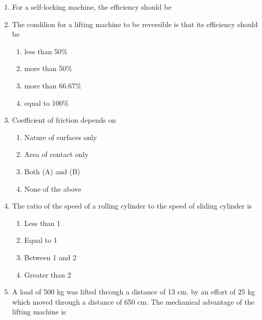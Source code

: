 \documentclass[11pt,a4paper]{article}
\begin{document}
\begin{enumerate}
\item{For a self-locking machine, the efficiency should be}
\\
\item{The condilion for a lifting machine to be reversible is that its efficiency should be}
\begin{enumerate}[label=\Alph*.]
\item{less than 50\%}
\item{more than 50\%}
\item{more than 66.67\%}
\item{equal to 100\%}
\end{enumerate}
\item{Coefficient of friction depends on}
\begin{enumerate}[label=\Alph*.]
\item{Nature of surfaces only}
\item{Area of contact only}
\item{Both (A) and (B)}
\item{None of the above}
\end{enumerate}
\item{The ratio of the speed of a rolling cylinder to the speed of sliding cylinder is}
\begin{enumerate}[label=\Alph*.]
\item{Less than 1}
\item{Equal to 1}
\item{Between 1 and 2}
\item{Greater than 2}
\end{enumerate}
\item{A load of 500 kg was lifted through a distance of 13 cm. by an effort of 25 kg which moved through a distance of 650 cm. The mechanical advantage of the lifting machine is}
\\

\end{enumerate}
\end{document}
